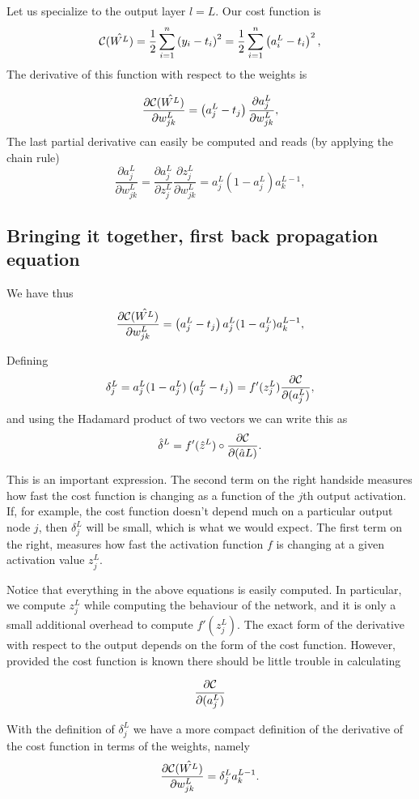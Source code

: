 \documentclass[%
oneside,                 %
final,                   %
10pt]{article}
\begin{document}
Let us specialize to the output layer $l=L$. Our cost function is
\[
{\cal C}(\hat{W^L})  =  \frac{1}{2}\sum_{i=1}^n\left(y_i - t_i\right)^2=\frac{1}{2}\sum_{i=1}^n\left(a_i^L - t_i\right)^2, 
\]
The derivative of this function with respect to the weights is

\[
\frac{\partial{\cal C}(\hat{W^L})}{\partial w_{jk}^L}  =  \left(a_j^L - t_j\right)\frac{\partial a_j^L}{\partial w_{jk}^{L}}, 
\]
The last partial derivative can easily be computed and reads (by applying the chain rule)
\[
\frac{\partial a_j^L}{\partial w_{jk}^{L}} = \frac{\partial a_j^L}{\partial z_{j}^{L}}\frac{\partial z_j^L}{\partial w_{jk}^{L}}=a_j^L(1-a_j^L)a_k^{L-1},  
\]



\subsection*{Bringing it together, first back propagation equation}

We have thus
\[
\frac{\partial{\cal C}(\hat{W^L})}{\partial w_{jk}^L}  =  \left(a_j^L - t_j\right)a_j^L(1-a_j^L)a_k^{L-1}, 
\]

Defining
\[
\delta_j^L = a_j^L(1-a_j^L)\left(a_j^L - t_j\right) = f'(z_j^L)\frac{\partial {\cal C}}{\partial (a_j^L)},
\]
and using the Hadamard product of two vectors we can write this as
\[
\hat{\delta}^L = f'(\hat{z}^L)\circ\frac{\partial {\cal C}}{\partial (\hat{a}L)}.
\]

This is an important expression. The second term on the right handside
measures how fast the cost function is changing as a function of the $j$th
output activation.  If, for example, the cost function doesn't depend
much on a particular output node $j$, then $\delta_j^L$ will be small,
which is what we would expect. The first term on the right, measures
how fast the activation function $f$ is changing at a given activation
value $z_j^L$.

Notice that everything in the above equations is easily computed.  In
particular, we compute $z_j^L$ while computing the behaviour of the
network, and it is only a small additional overhead to compute
$f'(z^L_j)$.  The exact form of the derivative with respect to the
output depends on the form of the cost function.
However, provided the cost function is known there should be little
trouble in calculating

\[
\frac{\partial {\cal C}}{\partial (a_j^L)}
\]

With the definition of $\delta_j^L$ we have a more compact definition of the derivative of the cost function in terms of the weights, namely
\[
\frac{\partial{\cal C}(\hat{W^L})}{\partial w_{jk}^L}  =  \delta_j^La_k^{L-1}.
\]
\end{document}
